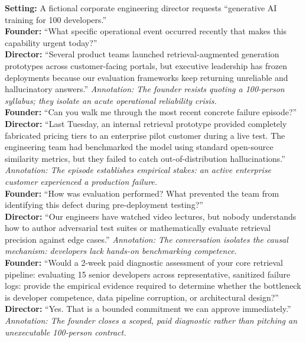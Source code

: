 \textbf{Setting:} A fictional corporate engineering director requests ``generative AI training for 100 developers.''\\[0.5ex]
\textbf{Founder:} ``What specific operational event occurred recently that makes this capability urgent today?''\\[0.5ex]
\textbf{Director:} ``Several product teams launched retrieval-augmented generation prototypes across customer-facing portals, but executive leadership has frozen deployments because our evaluation frameworks keep returning unreliable and hallucinatory answers.''\newline
\textit{Annotation: The founder resists quoting a 100-person syllabus; they isolate an acute operational reliability crisis.}\\[0.5ex]
\textbf{Founder:} ``Can you walk me through the most recent concrete failure episode?''\\[0.5ex]
\textbf{Director:} ``Last Tuesday, an internal retrieval prototype provided completely fabricated pricing tiers to an enterprise pilot customer during a live test. The engineering team had benchmarked the model using standard open-source similarity metrics, but they failed to catch out-of-distribution hallucinations.''\newline
\textit{Annotation: The episode establishes empirical stakes: an active enterprise customer experienced a production failure.}\\[0.5ex]
\textbf{Founder:} ``How was evaluation performed? What prevented the team from identifying this defect during pre-deployment testing?''\\[0.5ex]
\textbf{Director:} ``Our engineers have watched video lectures, but nobody understands how to author adversarial test suites or mathematically evaluate retrieval precision against edge cases.''\newline
\textit{Annotation: The conversation isolates the causal mechanism: developers lack hands-on benchmarking competence.}\\[0.5ex]
\textbf{Founder:} ``Would a 2-week paid diagnostic assessment of your core retrieval pipeline: evaluating 15 senior developers across representative, sanitized failure logs: provide the empirical evidence required to determine whether the bottleneck is developer competence, data pipeline corruption, or architectural design?''\\[0.5ex]
\textbf{Director:} ``Yes. That is a bounded commitment we can approve immediately.''\newline
\textit{Annotation: The founder closes a scoped, paid diagnostic rather than pitching an unexecutable 100-person contract.}

